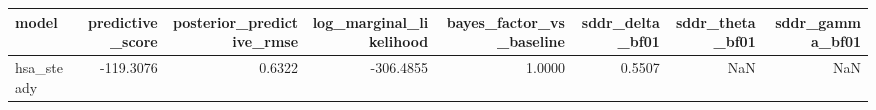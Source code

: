 \begin{tabular}{lrrrrrrr}
\toprule
model & predictive\_score & posterior\_predictive\_rmse & log\_marginal\_likelihood & bayes\_factor\_vs\_baseline & sddr\_delta\_bf01 & sddr\_theta\_bf01 & sddr\_gamma\_bf01 \\
\midrule
hsa\_steady & -119.3076 & 0.6322 & -306.4855 & 1.0000 & 0.5507 & NaN & NaN \\
\bottomrule
\end{tabular}
